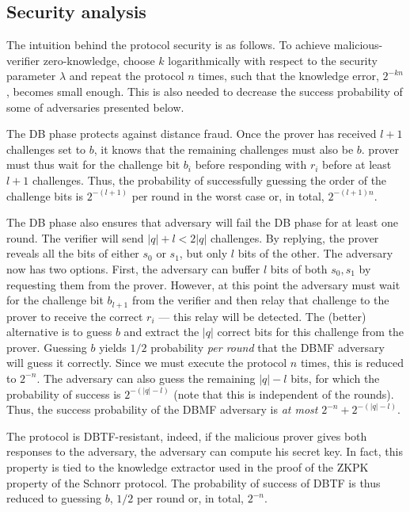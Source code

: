 \subsection{Security analysis}

The intuition behind the protocol security is as follows.
To achieve malicious-verifier zero-knowledge, choose \(k\) logarithmically with 
respect to the security parameter \(\lambda\) and repeat the protocol \(n\) 
times, such that the knowledge error, \(2^{-kn}\), becomes small enough.
This is also needed to decrease the success probability of some of adversaries 
presented below.

The \ac{DB} phase protects against distance fraud.
Once the prover has received \(l+1\) challenges set to \(b\), it knows that the 
remaining challenges must also be \(b\).
 prover must thus wait for the challenge bit \(b_i\) before 
responding with \(r_i\) before at least \(l+1\) challenges.
Thus, the probability of successfully guessing the order of the challenge bits 
is \(2^{-(l+1)}\) per round in the worst case or, in total, \(2^{-(l+1)n}\).

The \ac{DB} phase also ensures that  adversary will fail the \ac{DB} 
phase for at least one round.
The verifier will send \(|q| + l < 2|q|\) challenges.
By replying, the prover reveals all the bits of either \(s_0\) or \(s_1\), but 
only \(l\) bits of the other.
The adversary now has two options.
First, the adversary can buffer \(l\) bits of both \(s_0, s_1\) by requesting 
them from the prover.
However, at this point the adversary must wait for the challenge bit 
\(b_{l+1}\) from the verifier and then relay that challenge to the prover to 
receive the correct \(r_i\) --- this relay will be detected.
The (better) alternative is to guess \(b\) and extract the \(|q|\) correct bits 
for this challenge from the prover.
Guessing \(b\) yields \(1/2\) probability \emph{per round} that the \ac{DBMF} 
adversary will guess it correctly.
Since we must execute the protocol \(n\) times, this is reduced to \(2^{-n}\).
The adversary can also guess the remaining \(|q|-l\) bits, for which the 
probability of success is \(2^{-(|q|-l)}\) (note that this is independent of 
the rounds).
Thus, the success probability of the \ac{DBMF} adversary is \emph{at most} 
\(2^{-n}+2^{-(|q|-l)}\).

The protocol is \ac{DBTF}-resistant, indeed, if the malicious prover gives both 
responses to the adversary, the adversary can compute his secret key.
In fact, this property is tied to the knowledge extractor used in the proof of 
the \ac{ZKPK} property of the Schnorr protocol.
The probability of success of \ac{DBTF} is thus reduced to guessing \(b\), \ie 
\(1/2\) per round or, in total, \(2^{-n}\).

